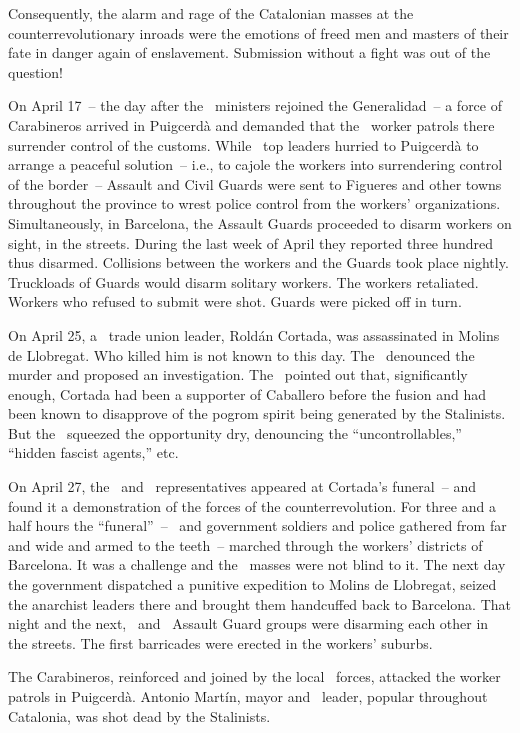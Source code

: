 Consequently, the alarm and rage of the Catalonian masses at the counterrevolutionary inroads were the emotions of freed men and masters of their fate in danger again of enslavement. Submission without a fight was out of the question!

On April 17~-- the day after the \CNT\ ministers rejoined the Ge\-ne\-ra\-li\-dad~-- a force of Carabineros arrived in Puigcerd\`a and demanded that the \CNT\ worker patrols there surrender control of the customs. While \CNT\ top leaders hurried to Puigcerd\`a to arrange a peaceful solution~-- i.e., to cajole the workers into surrendering control of the border~-- Assault and Civil Guards were sent to Figueres and other towns throughout the province to wrest police control from the workers’ organizations. Simultaneously, in Barcelona, the Assault Guards proceeded to disarm workers on sight, in the streets. During the last week of April they reported three hundred thus disarmed. Collisions between the workers and the Guards took place nightly. Truckloads of Guards would disarm solitary workers. The workers retaliated. Workers who refused to submit were shot. Guards were picked off in turn.

On April 25, a \PSUC\ trade union leader, Rold\'an Cortada, was assassinated in Molins de Llobregat. Who killed him is not known to this day. The \CNT\ denounced the murder and proposed an investigation. The \POUM\ pointed out that, significantly enough, Cortada had been a supporter of Caballero before the fusion and had been known to disapprove of the pogrom spirit being generated by the Stalinists. But the \PSUC\ squeezed the opportunity dry, denouncing the ``uncontrollables,'' ``hidden fascist agents,'' etc.

On April 27, the \CNT\ and \POUM\ representatives appeared at Cortada’s funeral~-- and found it a demonstration of the forces of the counterrevolution. For three and a half hours the ``funeral''~-- \PSUC\ and government soldiers and police gathered from far and wide and armed to the teeth~-- marched through the workers’ districts of Barcelona. It was a challenge and the \CNT\ masses were not blind to it. The next day the government dispatched a punitive expedition to Molins de Llobregat, seized the anarchist leaders there and brought them handcuffed back to Barcelona. That night and the next, \CNT\ and \PSUC\ Assault Guard groups were disarming each other in the streets. The first barricades were erected in the workers’ suburbs.

The Carabineros, reinforced and joined by the local \PSUC\ forces, attacked the worker patrols in Puigcerd\`a. Antonio Mart\'in, mayor and \CNT\ leader, popular throughout Catalonia, was shot dead by the Stalinists.

